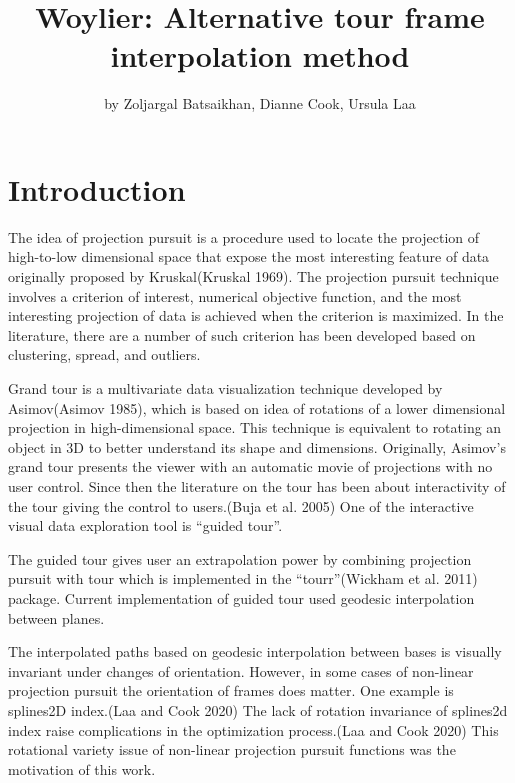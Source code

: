 \title{Woylier: Alternative tour frame interpolation method}
\author{by Zoljargal Batsaikhan, Dianne Cook, Ursula Laa}

\maketitle


\hypertarget{introduction}{%
\section{Introduction}\label{introduction}}

The idea of projection pursuit is a procedure used to locate the projection of high-to-low dimensional space that expose the most interesting feature of data originally proposed by Kruskal(Kruskal 1969). The projection pursuit technique involves a criterion of interest, numerical objective function, and the most interesting projection of data is achieved when the criterion is maximized. In the literature, there are a number of such criterion has been developed based on clustering, spread, and outliers.

Grand tour is a multivariate data visualization technique developed by Asimov(Asimov 1985), which is based on idea of rotations of a lower dimensional projection in high-dimensional space. This technique is equivalent to rotating an object in 3D to better understand its shape and dimensions. Originally, Asimov's grand tour presents the viewer with an automatic movie of projections with no user control. Since then the literature on the tour has been about interactivity of the tour giving the control to users.(Buja et al. 2005) One of the interactive visual data exploration tool is ``guided tour''.

The guided tour gives user an extrapolation power by combining projection pursuit with tour which is implemented in the ``tourr''(Wickham et al. 2011) package. Current implementation of guided tour used geodesic interpolation between planes.

The interpolated paths based on geodesic interpolation between bases is visually invariant under changes of orientation. However, in some cases of non-linear projection pursuit the orientation of frames does matter. One example is splines2D index.(Laa and Cook 2020) The lack of rotation invariance of splines2d index raise complications in the optimization process.(Laa and Cook 2020) This rotational variety issue of non-linear projection pursuit functions was the motivation of this work.

